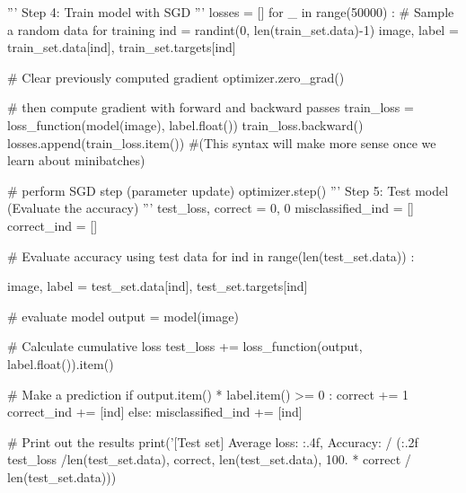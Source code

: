 \documentclass[10pt]{article}
\begin{document}
\begin{python}
'''
Step 4: Train model with SGD
'''
losses = []
for _ in range(50000) :
    # Sample a random data for training
    ind = randint(0, len(train_set.data)-1)
    image, label = train_set.data[ind], train_set.targets[ind]

    # Clear previously computed gradient
    optimizer.zero_grad()

    # then compute gradient with forward and backward passes
    train_loss = loss_function(model(image), label.float())
    train_loss.backward()
    losses.append(train_loss.item())
    #(This syntax will make more sense once we learn about minibatches)

    # perform SGD step (parameter update)
    optimizer.step()
'''
Step 5: Test model (Evaluate the accuracy)
'''
test_loss, correct = 0, 0
misclassified_ind = []
correct_ind = []

# Evaluate accuracy using test data
for ind in range(len(test_set.data)) :

    image, label = test_set.data[ind], test_set.targets[ind]

    # evaluate model
    output = model(image)

    # Calculate cumulative loss
    test_loss += loss_function(output, label.float()).item()

    # Make a prediction
    if output.item() * label.item() >= 0 :
        correct += 1
        correct_ind += [ind]
    else:
        misclassified_ind += [ind]

# Print out the results
print('[Test set] Average loss: {:.4f}, Accuracy: {}/{} ({:.2f}%
        test_loss /len(test_set.data), correct, len(test_set.data),
        100. * correct / len(test_set.data)))
\end{python}
\end{document}
